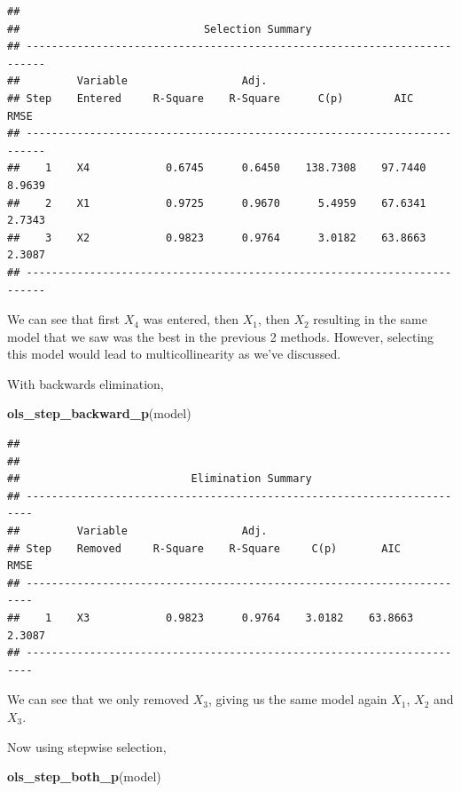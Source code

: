\documentclass[
  11pt,
]{article}
\newenvironment{Shaded}{\begin{snugshade}}{\end{snugshade}}
\newcommand{\FunctionTok}[1]{\textcolor[rgb]{0.13,0.29,0.53}{\textbf{#1}}}
\newcommand{\NormalTok}[1]{#1}
\begin{document}
\begin{verbatim}
## 
##                             Selection Summary                             
## -------------------------------------------------------------------------
##         Variable                  Adj.                                       
## Step    Entered     R-Square    R-Square      C(p)        AIC       RMSE     
## -------------------------------------------------------------------------
##    1    X4            0.6745      0.6450    138.7308    97.7440    8.9639    
##    2    X1            0.9725      0.9670      5.4959    67.6341    2.7343    
##    3    X2            0.9823      0.9764      3.0182    63.8663    2.3087    
## -------------------------------------------------------------------------
\end{verbatim}

We can see that first \(X_4\) was entered, then \(X_1\), then \(X_2\)
resulting in the same model that we saw was the best in the previous 2
methods. However, selecting this model would lead to multicollinearity
as we've discussed.

With backwards elimination,

\begin{Shaded}
\begin{Highlighting}[]
\FunctionTok{ols\_step\_backward\_p}\NormalTok{(model)}
\end{Highlighting}
\end{Shaded}

\begin{verbatim}
## 
## 
##                           Elimination Summary                           
## -----------------------------------------------------------------------
##         Variable                  Adj.                                     
## Step    Removed     R-Square    R-Square     C(p)       AIC       RMSE     
## -----------------------------------------------------------------------
##    1    X3            0.9823      0.9764    3.0182    63.8663    2.3087    
## -----------------------------------------------------------------------
\end{verbatim}

We can see that we only removed \(X_3\), giving us the same model again
\(X_1\), \(X_2\) and \(X_3\).

Now using stepwise selection,

\begin{Shaded}
\begin{Highlighting}[]
\FunctionTok{ols\_step\_both\_p}\NormalTok{(model)}
\end{Highlighting}
\end{Shaded}
\end{document}
